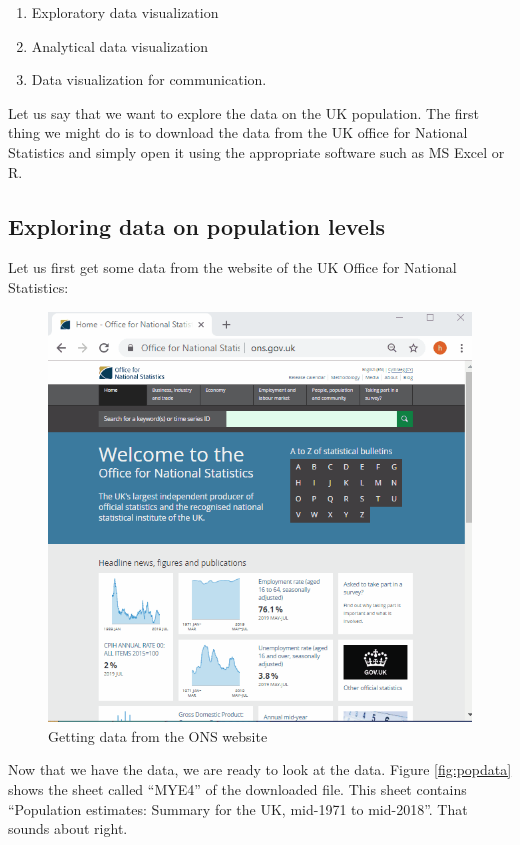 \documentclass[]{book}
\providecommand{\tightlist}{%
  \setlength{\itemsep}{0pt}\setlength{\parskip}{0pt}}
\begin{document}
\begin{enumerate}
\def\labelenumi{\arabic{enumi}.}
\tightlist
\item
  Exploratory data visualization
\item
  Analytical data visualization
\item
  Data visualization for communication.
\end{enumerate}

Let us say that we want to explore the data on the UK population. The first thing we might do is to download the data from the UK office for National Statistics and simply open it using the appropriate software such as MS Excel or R.

\hypertarget{exploring-data-on-population-levels}{%
\subsection{Exploring data on population levels}\label{exploring-data-on-population-levels}}

Let us first get some data from the website of the UK Office for National Statistics:

\begin{figure}

{\centering \includegraphics[width=0.7\linewidth]{_resources/chapter_people/gettingpopdata} 

}

\caption{Getting data from the ONS website}\label{fig:gettingdata}
\end{figure}

Now that we have the data, we are ready to look at the data. Figure \ref{fig:popdata} shows the sheet called ``MYE4'' of the downloaded file. This sheet contains ``Population estimates: Summary for the UK, mid-1971 to mid-2018''. That sounds about right.
\end{document}
